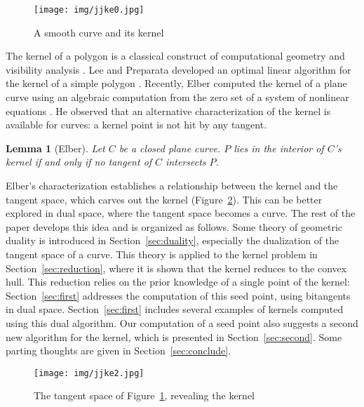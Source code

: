 \documentclass{sig-alternate}
\newtheorem{lemma}[theorem]{Lemma}
\begin{document}
\begin{figure}[h]
\begin{center}
\texttt{[image: img/jjke0.jpg]}
\end{center}
\caption{A smooth curve and its kernel}
\label{fig:curveob1b}
\end{figure}

The kernel of a polygon is a classical construct of computational geometry
\cite{goodman97,preparata85} and visibility analysis \cite{orourke87}.
Lee and Preparata developed an optimal linear algorithm 
for the kernel of a simple polygon \cite{lee79}.
Recently, Elber computed the kernel of a plane curve using 
an algebraic computation from the zero set of a system of nonlinear equations
\cite{elber02}.
He observed that 
an alternative characterization of the kernel is available for curves:
a kernel point is not hit by any tangent.

\begin{lemma}[Elber]
\label{lem:primalkernelchar}
Let $C$ be a closed plane curve.
$P$ lies in the interior of $C$'s kernel if and only if 
no tangent of $C$ intersects $P$.
\end{lemma}

Elber's characterization establishes a relationship between the kernel 
and the tangent space,
which carves out the kernel (Figure~\ref{fig:kernelFromTangSpace}).
This can be better explored in dual space, where the tangent space
becomes a curve.
The rest of the paper develops this idea and is organized as follows.
Some theory of geometric duality is introduced in Section~\ref{sec:duality},
especially the dualization of the tangent space of a curve.
This theory is applied to the kernel problem in Section~\ref{sec:reduction},
where it is shown that the kernel reduces to the convex hull.
This reduction relies on the prior knowledge of a 
single point of the kernel:
Section~\ref{sec:first} addresses the computation of this seed point,
using bitangents in dual space.
Section~\ref{sec:first} includes several examples of kernels computed using
this dual algorithm.
Our computation of a seed point also suggests a second new algorithm
for the kernel, which is presented in Section~\ref{sec:second}.
Some parting thoughts are given in Section~\ref{sec:conclude}.

\begin{figure}
\begin{center}
\texttt{[image: img/jjke2.jpg]}
\end{center}
\caption{The tangent space of Figure~\ref{fig:curveob1b}, revealing the kernel}
\label{fig:kernelFromTangSpace}
\end{figure}
\end{document}
